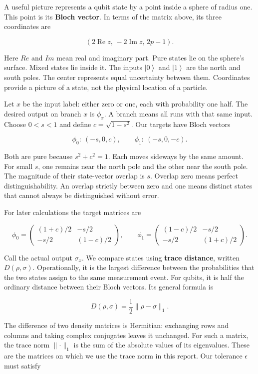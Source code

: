 \documentclass[11pt,letterpaper]{article}
\begin{document}
A useful picture represents a qubit state by a point inside a sphere of radius one. This point is its \textbf{Bloch vector}. In terms of the matrix above, its three coordinates are

\[(2\operatorname{Re}z,\, - 2\operatorname{Im}z,\, 2p - 1).\]

Here \(Re\) and \(Im\) mean real and imaginary part. Pure states lie on the sphere's surface. Mixed states lie inside it. The inputs \(\left| 0 \right\rangle\) and \(\left| 1 \right\rangle\) are the north and south poles. The center represents equal uncertainty between them. Coordinates provide a picture of a state, not the physical location of a particle.

Let \(x\) be the input label: either zero or one, each with probability one half. The desired output on branch \(x\) is \(\phi_{x}\). A branch means all runs with that same input. Choose \(0 < s < 1\) and define \(c = \sqrt{1 - s^{2}}\). Our targets have Bloch vectors

\[\phi_{0}:\ ( - s,0,c),\quad\quad\phi_{1}:\ ( - s,0, - c).\]

Both are pure because \(s^{2} + c^{2} = 1\). Each moves sideways by the same amount. For small \(s\), one remains near the north pole and the other near the south pole. The magnitude of their state-vector overlap is \(s\). Overlap zero means perfect distinguishability. An overlap strictly between zero and one means distinct states that cannot always be distinguished without error.

For later calculations the target matrices are

\[\phi_{0} = \begin{pmatrix}
(1 + c)/2 & - s/2 \\
 - s/2 & (1 - c)/2
\end{pmatrix},\quad\quad\phi_{1} = \begin{pmatrix}
(1 - c)/2 & - s/2 \\
 - s/2 & (1 + c)/2
\end{pmatrix}.\]

Call the actual output \(\sigma_{x}\). We compare states using \textbf{trace distance}, written \(D(\rho,\sigma)\). Operationally, it is the largest difference between the probabilities that the two states assign to the same measurement event. For qubits, it is half the ordinary distance between their Bloch vectors. Its general formula is

\[D(\rho,\sigma) = \frac{1}{2} \lVert \rho - \sigma\rVert_{1}.\]

The difference of two density matrices is Hermitian: exchanging rows and columns and taking complex conjugates leaves it unchanged. For such a matrix, the trace norm \(\lVert \cdot\rVert_{1}\) is the sum of the absolute values of its eigenvalues. These are the matrices on which we use the trace norm in this report. Our tolerance \(\epsilon\) must satisfy
\end{document}
